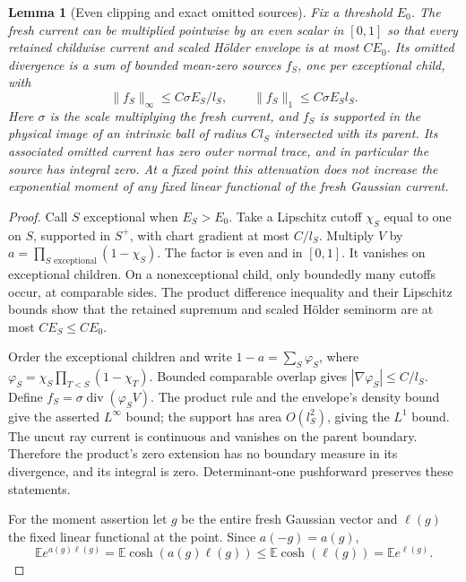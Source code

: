 \documentclass[11pt]{article}
\newtheorem{lemma}[theorem]{Lemma}
\newcommand{\E}{\mathbb E}
\newcommand{\Div}{\operatorname{div}}
\numberwithin{equation}{section}
\begin{document}
\begin{lemma}[Even clipping and exact omitted sources]
\label{lem:local-clipping}
Fix a threshold $E_0$. The fresh current can be multiplied pointwise by
an even scalar in $[0,1]$ so that every retained childwise current and
scaled H\"older envelope is at most $CE_0$. Its omitted divergence is a
sum of bounded mean-zero sources $f_S$, one per exceptional child, with
\[
 \|f_S\|_\infty\le C\sigma E_S/l_S,
 \qquad \|f_S\|_1\le C\sigma E_Sl_S.
\]
Here $\sigma$ is the scale multiplying the fresh current, and $f_S$ is
supported in the physical image of an intrinsic ball of radius $Cl_S$
intersected with its parent. Its associated omitted current has zero outer
normal trace, and in particular the source has integral zero.
At a fixed point this attenuation does not increase the exponential
moment of any fixed linear functional of the fresh Gaussian current.
\end{lemma}
\begin{proof}
Call $S$ exceptional when $E_S>E_0$. Take a Lipschitz cutoff $\chi_S$
equal to one on $S$, supported in $S^+$, with chart gradient at most
$C/l_S$. Multiply $V$ by
$a=\prod_{S\text{ exceptional}}(1-\chi_S)$.
The factor is even and in $[0,1]$. It vanishes on exceptional children.
On a nonexceptional child, only boundedly many cutoffs occur, at
comparable sides. The product difference inequality and their Lipschitz
bounds show that the retained supremum and scaled H\"older seminorm
are at most $CE_S\le CE_0$.

Order the exceptional children and write
$1-a=\sum_S\varphi_S$, where
$\varphi_S=\chi_S\prod_{T<S}(1-\chi_T)$. Bounded comparable overlap gives
$|\nabla\varphi_S|\le C/l_S$. Define
$f_S=\sigma\Div(\varphi_SV)$. The product rule and the envelope's
density bound give the asserted $L^\infty$ bound; the support has area
$O(l_S^2)$, giving the $L^1$ bound. The uncut ray current is continuous
and vanishes on the parent boundary. Therefore the product's zero
extension has no boundary measure in its divergence, and its integral
is zero. Determinant-one pushforward preserves these statements.

For the moment assertion let $g$ be the entire fresh Gaussian vector
and $\ell(g)$ the fixed linear functional at the point. Since
$a(-g)=a(g)$,
\[
 \E e^{a(g)\ell(g)}=\E\cosh(a(g)\ell(g))
 \le\E\cosh(\ell(g))=\E e^{\ell(g)}.
\]
\end{proof}
\end{document}
